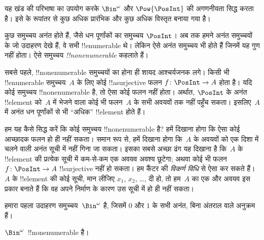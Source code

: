 \documentclass[../../../include/open-logic-section]{subfiles}
\begin{document}


\begin{editorial}
  यह खंड  की परिभाषा का उपयोग करके $\Bin^\omega$ और
  $\Pow{\PosInt}$ की अगणनीयता सिद्ध करता है। इसे  के
  रूपांतर से कुछ अधिक प्रारंभिक और कुछ अधिक विस्तृत बनाया गया है।
\end{editorial}

कुछ समुच्चय अनंत होते हैं, जैसे धन पूर्णांकों का समुच्चय $\PosInt$। अब तक
हमने अनंत समुच्चयों के जो उदाहरण देखे हैं, वे सभी !!{enumerable} थे। लेकिन
ऐसे अनंत समुच्चय भी होते हैं जिनमें यह गुण नहीं होता। ऐसे समुच्चय
\emph{!!{nonenumerable}} कहलाते हैं।

सबसे पहले, !!{nonenumerable} समुच्चयों का होना ही शायद आश्चर्यजनक लगे। किसी
भी !!{enumerable} समुच्चय~$A$ के लिए कोई !!a{surjective} फलन
$f \colon \PosInt \to A$ होता है। यदि कोई समुच्चय !!{nonenumerable} है, तो
ऐसा कोई फलन नहीं होता। अर्थात, $\PosInt$ के अनंत !!{element} को~$A$ में भेजने
वाला कोई भी फलन~$A$ के सभी अवयवों तक नहीं पहुँच सकता। इसलिए~$A$ में अनंत धन
पूर्णांकों से भी ``अधिक'' !!{element} होते हैं।

हम यह कैसे सिद्ध करें कि कोई समुच्चय !!{nonenumerable} है? हमें दिखाना होगा
कि ऐसा कोई आच्छादक फलन हो ही नहीं सकता। समान रूप से, हमें दिखाना होगा कि~$A$
के अवयवों को एक दिशा में चलने वाली अनंत सूची में नहीं गिना जा सकता। इसका सबसे
अच्छा ढंग यह दिखाना है कि~$A$ के !!{element} की प्रत्येक सूची में कम-से-कम एक
अवयव अवश्य छूटेगा; अथवा कोई भी फलन $f\colon \PosInt \to A$
!!{surjective} नहीं हो सकता। हम कैंटर की \emph{विकर्ण विधि} से ऐसा कर सकते
हैं।~$A$ के !!{element} की कोई सूची, मान लीजिए $x_1$, $x_2$, \dots, दी हो,
तो हम~$A$ का एक और अवयव इस प्रकार बनाते हैं कि वह अपने निर्माण के कारण उस
सूची में हो ही नहीं सकता।

हमारा पहला उदाहरण समुच्चय~$\Bin^\omega$ है, जिसमें $0$ और $1$ के सभी अनंत,
बिना अंतराल वाले अनुक्रम हैं।

\begin{thm}
$\Bin^\omega$~!!{nonenumerable} है।
\end{thm}
\end{document}
